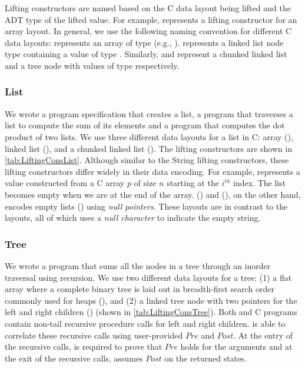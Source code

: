 

Lifting constructors are named based on the C data layout being lifted
and the \SpecL{} ADT type of the lifted value.
For example,  represents a  lifting constructor
for an array layout.
In general, we use the following naming convention for different C data layouts:
 represents an array of type  (e.g., ).
 represents a linked list node type containing a value of type .
Similarly,  and  represent a chunked linked list and a tree node
with values of type  respectively.


\vspace{-15px}
\subsubsection{List}
\vspace{-5px}
We wrote a \SpecL{} program specification that creates a list, a
program that traverses a list to compute the sum of its elements and a program
that computes the dot product of two lists. We use three different
data layouts for a list in C: array (),
linked list (), and
a chunked linked list ().
The lifting constructors are shown in \cref{tab:LiftingConsList}.
Although similar to the String lifting constructors, these lifting
constructors differ widely in their data encoding. For example,
 represents a  value constructed
from a C array $p$ of size $n$ starting at the $i^{th}$ index. The list becomes empty
when we are at the end of the array. ()
and (), on the other hand, encodes empty
lists () using {\em null pointers}. These layouts are in contrast to the
 layouts, all of which uses a {\em null character} to
indicate the empty string.


\vspace{-15px}
\subsubsection{Tree}
\vspace{-5px}
We wrote a \SpecL{} program that sums all the nodes in a tree
through an inorder traversal using recursion. We use two different data layouts for a tree: 
(1) a flat array where a
complete binary tree is laid out in breadth-first search order commonly used for heaps (),
and (2) a linked tree node with two pointers for the left and right children () (shown in \cref{tab:LiftingConsTree}).
Both \SpecL{} and C programs contain non-tail recursive procedure calls for left and right children.
\toolName{} is able to correlate these recursive calls using user-provided $Pre$ and $Post$.
At the entry of the recursive calls, \toolName{} is required to prove that $Pre$ holds for the arguments
and at the exit of the recursive calls, \toolName{} assumes $Post$ on the returned states.

